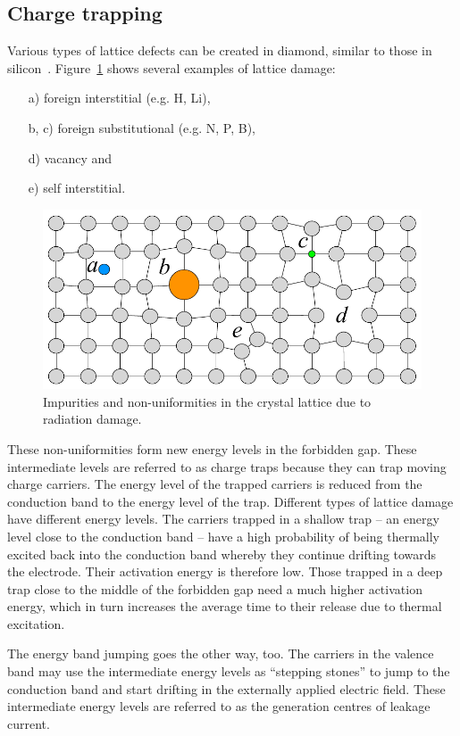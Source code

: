 \subsection{Charge trapping}
Various types of lattice defects can be created in diamond, similar to those in silicon~\cite{CHTR:00000}.
Figure~\ref{fig:raddamage} shows several examples of lattice damage:
\begin{enumerate}
\item[a)]foreign interstitial (e.g. H, Li),
\item[b, c)]foreign substitutional (e.g. N, P, B),
\item[d)]vacancy and
\item[e)]self interstitial.
\end{enumerate}
\begin{figure}[!t]
\begin{center}
\includegraphics[width=0.8\linewidth]{02_pulse_formation/pics/plots/raddamage}
\caption{Impurities and non-uniformities in the crystal lattice due to radiation damage.}
\label{fig:raddamage}
\end{center}
\end{figure} 
These non-uniformities form new energy levels in the forbidden gap. These intermediate levels are referred to as charge traps because they can trap moving charge carriers. The energy level of the trapped carriers is reduced from the conduction band to the energy level of the trap. Different types of lattice damage have different energy levels. The carriers trapped in a shallow trap -- an energy level close to the conduction band -- have a high probability of being thermally excited back into the conduction band whereby they continue drifting towards the electrode. Their activation energy is therefore low. Those trapped in a deep trap close to the middle of the forbidden gap need a much higher activation energy, which in turn increases the average time to their release due to thermal excitation.

The energy band jumping goes the other way, too. The carriers in the valence band may use the intermediate energy levels as ``stepping stones'' to jump to the conduction band and start drifting in the externally applied electric field. These intermediate energy levels are referred to as the generation centres of leakage current.




